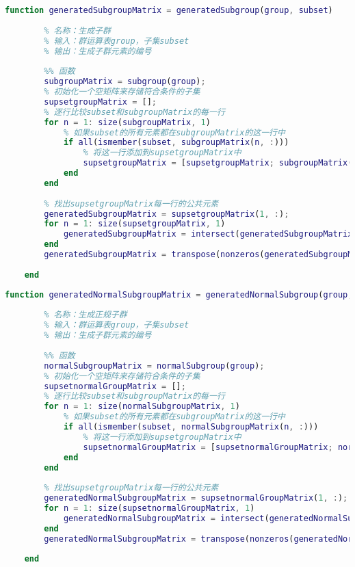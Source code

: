\begin{lstlisting}[language=Matlab, caption={生成子群}, label={generatedSubgroup}]
	function generatedSubgroupMatrix = generatedSubgroup(group, subset)
	
	    % 名称：生成子群
	    % 输入：群运算表group，子集subset
	    % 输出：生成子群元素的编号
	
	    %% 函数
	    subgroupMatrix = subgroup(group);
	    % 初始化一个空矩阵来存储符合条件的子集
	    supsetgroupMatrix = [];
	    % 逐行比较subset和subgroupMatrix的每一行
	    for n = 1: size(subgroupMatrix, 1)
	        % 如果subset的所有元素都在subgroupMatrix的这一行中
	        if all(ismember(subset, subgroupMatrix(n, :)))
	            % 将这一行添加到supsetgroupMatrix中
	            supsetgroupMatrix = [supsetgroupMatrix; subgroupMatrix(n, :)];
	        end
	    end
	    
	    % 找出supsetgroupMatrix每一行的公共元素
	    generatedSubgroupMatrix = supsetgroupMatrix(1, :);
	    for n = 1: size(supsetgroupMatrix, 1)
	        generatedSubgroupMatrix = intersect(generatedSubgroupMatrix, supsetgroupMatrix(n, :));
	    end
	    generatedSubgroupMatrix = transpose(nonzeros(generatedSubgroupMatrix));
	
	end
\end{lstlisting}

\begin{lstlisting}[language=Matlab, caption={生成正规子群}, label={generatedNormalSubgroup}]
	function generatedNormalSubgroupMatrix = generatedNormalSubgroup(group, subset)
	
	    % 名称：生成正规子群
	    % 输入：群运算表group，子集subset
	    % 输出：生成子群元素的编号
	
	    %% 函数
	    normalSubgroupMatrix = normalSubgroup(group);
	    % 初始化一个空矩阵来存储符合条件的子集
	    supsetnormalGroupMatrix = [];
	    % 逐行比较subset和subgroupMatrix的每一行
	    for n = 1: size(normalSubgroupMatrix, 1)
	        % 如果subset的所有元素都在subgroupMatrix的这一行中
	        if all(ismember(subset, normalSubgroupMatrix(n, :)))
	            % 将这一行添加到supsetgroupMatrix中
	            supsetnormalGroupMatrix = [supsetnormalGroupMatrix; normalSubgroupMatrix(n, :)];
	        end
	    end
	    
	    % 找出supsetgroupMatrix每一行的公共元素
	    generatedNormalSubgroupMatrix = supsetnormalGroupMatrix(1, :);
	    for n = 1: size(supsetnormalGroupMatrix, 1)
	        generatedNormalSubgroupMatrix = intersect(generatedNormalSubgroupMatrix, supsetnormalGroupMatrix(n, :));
	    end
	    generatedNormalSubgroupMatrix = transpose(nonzeros(generatedNormalSubgroupMatrix));
	
	end
\end{lstlisting}

